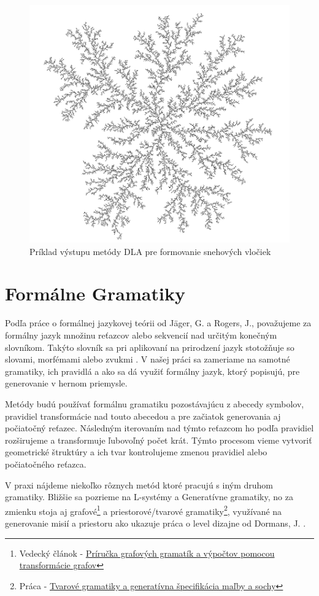 \begin{figure}[H]
    \centering
    \includegraphics[width=0.4\linewidth]{obrazky-figures/dla-graph.png}
    \caption{Príklad výstupu metódy DLA pre formovanie snehových vločiek}
    \label{fig:dla}
\end{figure}

\section{Formálne Gramatiky}

Podľa práce o formálnej jazykovej teórii od Jäger, G. a Rogers, J., považujeme za formálny jazyk množinu reťazcov alebo sekvencií nad určitým konečným slovníkom. Takýto slovník sa pri aplikovaní na prirodzení jazyk stotožňuje so slovami, morfémami alebo zvukmi \cite{jager2012formal}. V našej práci sa zameriame na samotné gramatiky, ich pravidlá a ako sa dá využiť formálny jazyk, ktorý popisujú, pre generovanie v hernom priemysle.

Metódy budú používať formálnu gramatiku pozostávajúcu z abecedy symbolov, pravidiel transformácie nad touto abecedou a pre začiatok generovania aj počiatočný reťazec. Následným iterovaním nad týmto reťazcom ho podľa pravidiel rozširujeme a transformuje ľubovoľný počet krát. Týmto procesom vieme vytvoriť geometrické štruktúry a ich tvar kontrolujeme zmenou pravidiel alebo počiatočného reťazca.

V praxi nájdeme niekoľko rôznych metód ktoré pracujú s iným druhom gramatiky. Bližšie sa pozrieme na L-systémy a Generatívne gramatiky, no za zmienku stoja aj grafové\footnote{Vedecký článok - \href{https://www.researchgate.net/publication/239580441_Handbook_of_Graph_Grammars_and_Computing_by_Graph_Transformation}{Príručka grafových gramatík a výpočtov pomocou transformácie grafov}} a priestorové/tvarové gramatiky\footnote{Práca - \href{https://citeseerx.ist.psu.edu/document?repid=rep1\&type=pdf\&doi=6dc9c55dade136193780a3ce0f5269036c5127cf}{Tvarové gramatiky a generatívna špecifikácia maľby a sochy}}, využívané na generovanie misií a priestoru ako ukazuje práca o level dizajne od Dormans, J. \cite{dormans2010adventures}.


